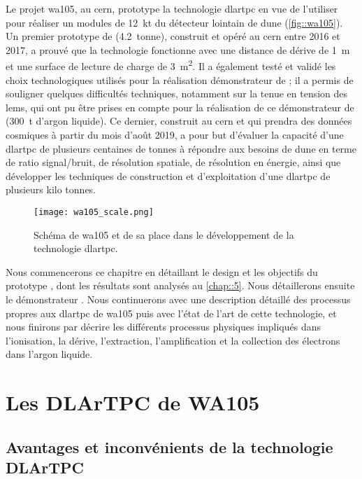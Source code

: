     Le projet \gls{wa105}, au \gls{cern}, prototype la technologie \gls{dlartpc} en vue de l'utiliser pour réaliser un modules de \SI{12}{\kilo\tonne} du détecteur lointain de \gls{dune} (\autoref{fig::wa105}). Un premier prototype de \TOO{} (\SI{4.2}{tonne}), construit et opéré au \gls{cern} entre 2016 et 2017, a prouvé que la technologie fonctionne avec une distance de dérive de \SI{1}{\meter} et une surface de lecture de charge de \SI{3}{\meter\squared}. Il a également testé et validé les choix technologiques utilisés pour la réalisation démonstrateur de \protodp{}; il a permis de souligner quelques difficultés techniques, notamment sur la tenue en tension des \glspl{lem}, qui ont pu être prises en compte pour la réalisation de ce démonstrateur de \SSS{} (\SI{300}{\tonne} d'argon liquide). Ce dernier, construit au \gls{cern} et qui prendra des données cosmiques à partir du mois d'août 2019, a pour but d'évaluer la capacité d'une \gls{dlartpc} de plusieurs centaines de tonnes à répondre aux besoins de \gls{dune} en terme de ratio signal/bruit, de résolution spatiale, de résolution en énergie, ainsi que développer les techniques de construction et d'exploitation d'une \gls{dlartpc} de plusieurs kilo tonnes.

    \begin{figure}[htbp]
      \begin{center}\texttt{[image: wa105\_scale.png]}\end{center}
      \caption[Schéma de .]{\label{fig::wa105}Schéma de \gls{wa105} et de sa place dans le développement de la technologie \gls{dlartpc}.}
    \end{figure}

    Nous commencerons ce chapitre en détaillant le design et les objectifs du prototype \TOO{}, dont les résultats sont analysés au \autoref{chap::5}. Nous détaillerons ensuite le démonstrateur \SSS{}. Nous continuerons avec une description détaillé des processus propres aux \gls{dlartpc} de \gls{wa105} puis avec l'état de l'art de cette technologie, et nous finirons par décrire les différents processus physiques impliqués dans l'ionisation, la dérive, l'extraction, l'amplification et la collection des électrons dans l'argon liquide.

  \section{Les DLArTPC de WA105}

    \subsection{Avantages et inconvénients de la technologie DLArTPC}


